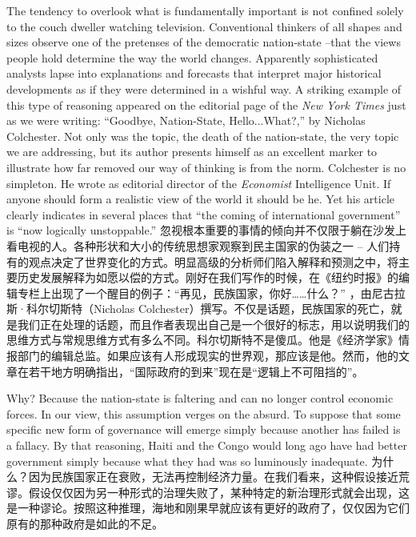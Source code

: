 \begin{Parallel}{97mm}{45mm}
  \ParallelLText
  {The tendency to overlook what is fundamentally important is not confined solely to the couch dweller watching television. Conventional thinkers of all shapes and sizes observe one of the pretenses of the democratic nation-state --that the views people hold determine the way the world changes. Apparently sophisticated analysts lapse into explanations and forecasts that interpret major historical developments as if they were determined in a wishful way. A striking example of this type of reasoning appeared on the editorial page of the \emph{New York Times} just as we were writing: “Goodbye, Nation-State, Hello...What?,” by Nicholas Colchester. Not only was the topic, the death of the nation-state, the very topic we are addressing, but its author presents himself as an excellent marker to illustrate how far removed our way of thinking is from the norm. Colchester is no simpleton. He wrote as editorial director of the \emph{Economist} Intelligence Unit. If anyone should form a realistic view of the world it should be he. Yet his article clearly indicates in several places that “the coming of international government” is “now logically unstoppable.”}  
  \ParallelRText
  {\small 忽视根本重要的事情的倾向并不仅限于躺在沙发上看电视的人。各种形状和大小的传统思想家观察到民主国家的伪装之一 -- 人们持有的观点决定了世界变化的方式。明显高级的分析师们陷入解释和预测之中，将主要历史发展解释为如愿以偿的方式。刚好在我们写作的时候，在《纽约时报》的编辑专栏上出现了一个醒目的例子：“再见，民族国家，你好……什么？” ，由尼古拉斯·科尔切斯特（Nicholas Colchester）撰写。不仅是话题，民族国家的死亡，就是我们正在处理的话题，而且作者表现出自己是一个很好的标志，用以说明我们的思维方式与常规思维方式有多么不同。科尔切斯特不是傻瓜。他是《经济学家》情报部门的编辑总监。如果应该有人形成现实的世界观，那应该是他。然而，他的文章在若干地方明确指出，“国际政府的到来”现在是“逻辑上不可阻挡的”。}
  \ParallelPar


  \ParallelLText
  {Why? Because the nation-state is faltering and can no longer control economic forces.  In our view, this assumption verges on the absurd. To suppose that some specific new form of governance will emerge simply because another has failed is a fallacy. By that reasoning, Haiti and the Congo would long ago have had better government simply because what they had was so luminously inadequate.   }  
  \ParallelRText
  {\small 为什么？因为民族国家正在衰败，无法再控制经济力量。在我们看来，这种假设接近荒谬。假设仅仅因为另一种形式的治理失败了，某种特定的新治理形式就会出现，这是一种谬论。按照这种推理，海地和刚果早就应该有更好的政府了，仅仅因为它们原有的那种政府是如此的不足。}
  \ParallelPar


\end{Parallel}
